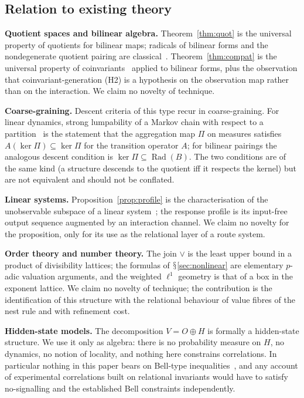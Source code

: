 \documentclass[11pt,a4paper]{article}
\renewcommand{\S}{\ensuremath{\mathsection}}
\newcommand{\Rad}{\operatorname{Rad}}
\newcommand{\vj}{\mathbin{\vee}}
\theoremstyle{plain}
\theoremstyle{definition}
\begin{document}
\subsection{Relation to existing theory}
\textbf{Quotient spaces and bilinear algebra.} Theorem~\ref{thm:quot} is the universal property of quotients for bilinear maps; radicals of bilinear forms and the nondegenerate quotient pairing are classical~\cite{Lan02,Rom08,Gre75}. Theorem~\ref{thm:compat} is the universal property of coinvariants~\cite{Bro82} applied to bilinear forms, plus the observation that coinvariant-generation (H2) is a hypothesis on the observation map rather than on the interaction. We claim no novelty of technique.
\par\smallskip\noindent
\textbf{Coarse-graining.} Descent criteria of this type recur in coarse-graining. For linear dynamics, strong lumpability of a Markov chain with respect to a partition~\cite{KS60} is the statement that the aggregation map $\Pi$ on measures satisfies $A(\ker\Pi)\subseteq\ker\Pi$ for the transition operator $A$; for bilinear pairings the analogous descent condition is $\ker\Pi\subseteq\Rad(B)$. The two conditions are of the same kind (a structure descends to the quotient iff it respects the kernel) but are not equivalent and should not be conflated.
\par\smallskip\noindent
\textbf{Linear systems.} Proposition~\ref{prop:profile} is the characterisation of the unobservable subspace of a linear system~\cite{Kal60,Son98}; the response profile is its input-free output sequence augmented by an interaction channel. We claim no novelty for the proposition, only for its use as the relational layer of a route system.
\par\smallskip\noindent
\textbf{Order theory and number theory.} The join $\vj$ is the least upper bound in a product of divisibility lattices; the formulas of \S\ref{sec:nonlinear} are elementary $p$-adic valuation arguments, and the weighted $\ell^1$ geometry is that of a box in the exponent lattice. We claim no novelty of technique; the contribution is the identification of this structure with the relational behaviour of value fibres of the nest rule and with refinement cost.
\par\smallskip\noindent
\textbf{Hidden-state models.} The decomposition $V=O\oplus H$ is formally a hidden-state structure. We use it only as algebra: there is no probability measure on $H$, no dynamics, no notion of locality, and nothing here constrains correlations. In particular nothing in this paper bears on Bell-type inequalities~\cite{Bel64,CHSH69,Tsi80}, and any account of experimental correlations built on relational invariants would have to satisfy no-signalling and the established Bell constraints independently.
\end{document}
